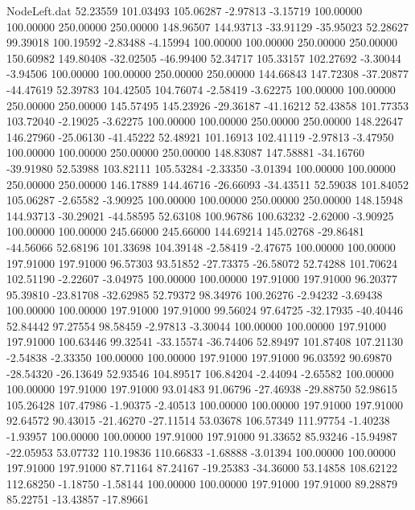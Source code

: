 \begin{filecontents}{NodeLeft.dat}
  52.23559  101.03493  105.06287    -2.97813   -3.15719  100.00000  100.00000  250.00000  250.00000  148.96507  144.93713  -33.91129  -35.95023
  52.28627   99.39018  100.19592    -2.83488   -4.15994  100.00000  100.00000  250.00000  250.00000  150.60982  149.80408  -32.02505  -46.99400
  52.34717  105.33157  102.27692    -3.30044   -3.94506  100.00000  100.00000  250.00000  250.00000  144.66843  147.72308  -37.20877  -44.47619
  52.39783  104.42505  104.76074    -2.58419   -3.62275  100.00000  100.00000  250.00000  250.00000  145.57495  145.23926  -29.36187  -41.16212
  52.43858  101.77353  103.72040    -2.19025   -3.62275  100.00000  100.00000  250.00000  250.00000  148.22647  146.27960  -25.06130  -41.45222
  52.48921  101.16913  102.41119    -2.97813   -3.47950  100.00000  100.00000  250.00000  250.00000  148.83087  147.58881  -34.16760  -39.91980
  52.53988  103.82111  105.53284    -2.33350   -3.01394  100.00000  100.00000  250.00000  250.00000  146.17889  144.46716  -26.66093  -34.43511
  52.59038  101.84052  105.06287    -2.65582   -3.90925  100.00000  100.00000  250.00000  250.00000  148.15948  144.93713  -30.29021  -44.58595
  52.63108  100.96786  100.63232    -2.62000   -3.90925  100.00000  100.00000  245.66000  245.66000  144.69214  145.02768  -29.86481  -44.56066
  52.68196  101.33698  104.39148    -2.58419   -2.47675  100.00000  100.00000  197.91000  197.91000   96.57303   93.51852  -27.73375  -26.58072
  52.74288  101.70624  102.51190    -2.22607   -3.04975  100.00000  100.00000  197.91000  197.91000   96.20377   95.39810  -23.81708  -32.62985
  52.79372   98.34976  100.26276    -2.94232   -3.69438  100.00000  100.00000  197.91000  197.91000   99.56024   97.64725  -32.17935  -40.40446
  52.84442   97.27554   98.58459    -2.97813   -3.30044  100.00000  100.00000  197.91000  197.91000  100.63446   99.32541  -33.15574  -36.74406
  52.89497  101.87408  107.21130    -2.54838   -2.33350  100.00000  100.00000  197.91000  197.91000   96.03592   90.69870  -28.54320  -26.13649
  52.93546  104.89517  106.84204    -2.44094   -2.65582  100.00000  100.00000  197.91000  197.91000   93.01483   91.06796  -27.46938  -29.88750
  52.98615  105.26428  107.47986    -1.90375   -2.40513  100.00000  100.00000  197.91000  197.91000   92.64572   90.43015  -21.46270  -27.11514
  53.03678  106.57349  111.97754    -1.40238   -1.93957  100.00000  100.00000  197.91000  197.91000   91.33652   85.93246  -15.94987  -22.05953
  53.07732  110.19836  110.66833    -1.68888   -3.01394  100.00000  100.00000  197.91000  197.91000   87.71164   87.24167  -19.25383  -34.36000
  53.14858  108.62122  112.68250    -1.18750   -1.58144  100.00000  100.00000  197.91000  197.91000   89.28879   85.22751  -13.43857  -17.89661

\end{filecontents}
